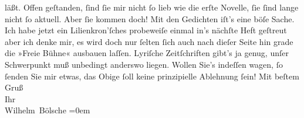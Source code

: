 \begin{ledgroupsized}[t]{13cm}
               läßt. Offen geſtanden, ſind ſie mir nicht ſo lieb wie die erſte Novelle, ſie ſind lange nicht ſo aktuell.
               Aber ſie kommen doch!\pend
           \pstart
           Mit den Gedichten iſt’s eine böſe Sache. Ich habe jetzt ein Lilienkron’ſches probeweiſe einmal
               in’s nächſte Heft geſtreut {\pb}aber ich denke mir, es
               wird doch nur ſelten ſich auch nach dieſer Seite hin grade die »Freie Bühne« ausbauen laſſen. Lyriſche Zeitſchriften gibt’s ja
               genug, unſer Schwerpunkt muß unbedingt anderswo liegen. Wollen Sie’s indeſſen wagen,
               ſo ſenden Sie mir etwas, das Obige ſoll keine prinzipielle Ablehnung ſein!\pend
           \pstart
           Mit beſtem Gruß{\\[\baselineskip]}Ihr{\\[\baselineskip]}\spacefill\mbox{Wilhelm Bölsche}\pend
           \leftskip=0em{}
         
         \endnumbering{}\end{ledgroupsized}  \newcommand{\dateiname}{L00087}\newcommand{\titel}{Wilhelm Bölsche an Arthur Schnitzler, 24. 3. 1892}\newcommand{\editorInnen}{Martin Anton Müller und Gerd-Hermann Susen}
      